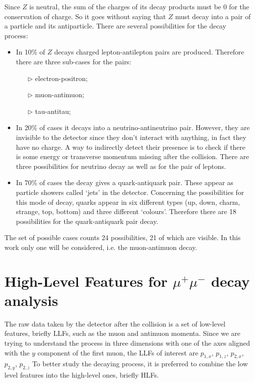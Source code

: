 Since $Z$ is neutral, the sum of the charges of its decay products must be 0 for the conservation of charge. So it goes without saying that $Z$ must decay into a pair of a particle and its antiparticle. There are several possibilities for the decay process\footnotemark:
\begin{itemize}
	\item In 10\% of $Z$ decays charged lepton-antilepton pairs are produced. Therefore there are three sub-cases for the pairs:
	\begin{itemize}
		\item[$\triangleright$] electron-positron;
		\item[$\triangleright$] muon-antimuon;
		\item[$\triangleright$] tau-antitau;
	\end{itemize}
	
	\item In 20\% of cases it decays into a neutrino-antineutrino pair. However, they are invisible to the detector since they don't interact with anything, in fact they have no charge. A way to indirectly detect their presence is to check if there is some energy or transverse momentum missing after the collision. There are three possibilities for neutrino decay as well as for the pair of leptons.
	
	\item In 70\% of cases the decay gives a quark-antiquark pair. These appear as particle showers called `jets' in the detector. Concerning the possibilities for this mode of decay, quarks appear in six different types (up, down, charm, strange, top, bottom) and three different `colours'. Therefore there are 18 possibilities for the quark-antiquark pair decay.
\end{itemize}


The set of possible cases counts 24 possibilities, 21 of which are visible. In this work only one will be considered, i.e. the muon-antimuon decay.





\section{High-Level Features for $\mu^{+}\mu^{-}$ decay analysis}
The raw data taken by the detector after the collision is a set of low-level features, briefly LLFs, such as the muon and antimuon momenta. Since we are trying to understand the process in three dimensions with one of the axes aligned with the $y$ component of the first muon, the LLFs of interest are $p_{1,x}$, $p_{1,z}$, $p_{2,x}$, $p_{2,y}$, $p_{2,z}$
To better study the decaying process, it is preferred to combine the low level features into the high-level ones, briefly HLFs.


